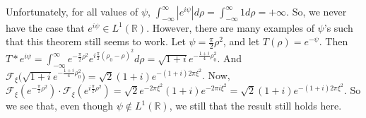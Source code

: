 \documentclass{article}
\theoremstyle{mystyle}
\begin{document}
Unfortunately, for all values of $\psi$, $\int_{-\infty}^{\infty} |e^{i\psi}|d\rho = \int_{-\infty}^{\infty} 1d\rho = +\infty$. So, we never have the case that $e^{i\psi} \in L^{1}(\mathbb{R})$. However, there are many examples of $\psi$'s such that this theorem still seems to work. Let $\psi = \frac{\pi}{2}\rho^2$, and let $T(\rho) = e^{-\psi}$. Then $T*e^{i\psi} = \int_{-\infty}^{\infty} e^{-\frac{\pi}{2}\rho^2}e^{i\frac{\pi}{2}(\rho_0-\rho)^2}d\rho = \sqrt{1+i}e^{-\frac{1+i}{4}\rho_0^2}$. And $\mathcal{F}_{\xi}\big(\sqrt{1+i}e^{-\frac{1+i}{4}\rho_0^2}\big) = \sqrt{2}(1+i)e^{-(1+i)2\pi \xi^2}$. Now, $\mathcal{F}_{\xi}(e^{-\frac{\pi}{2}\rho^2})\cdot \mathcal{F}_{\xi}(e^{i\frac{\pi}{2}\rho^2}) = \sqrt{2}e^{-2\pi \xi^2}(1+i)e^{-2\pi i \xi^2} = \sqrt{2}(1+i)e^{-(1+i)2\pi \xi^2}$. So we see that, even though $\psi \notin L^{1}(\mathbb{R})$, we still that the result still holds here. 
\end{document}
